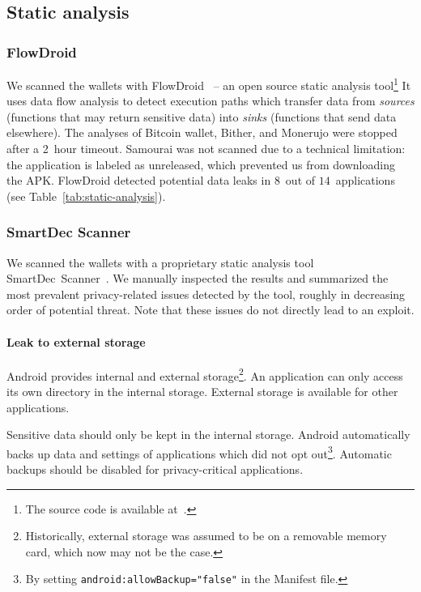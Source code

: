 \subsection{Static analysis}

\subsubsection*{FlowDroid}

We scanned the wallets with FlowDroid~\cite{Arzt2014} -- an open source static analysis tool\footnote{The source code is available at~\cite{FlowDroid}.}
It uses data flow analysis to detect execution paths which transfer data from \textit{sources} (functions that may return sensitive data) into \textit{sinks} (functions that send data elsewhere).
The analyses of Bitcoin wallet, Bither, and Monerujo were stopped after a 2~hour timeout.
Samourai was not scanned due to a technical limitation: the application is labeled as unreleased, which prevented us from downloading the APK.
FlowDroid detected potential data leaks in $8$~out of $14$~applications (see Table~\ref{tab:static-analysis}).

\subsubsection*{SmartDec Scanner}
We scanned the wallets with a proprietary static analysis tool SmartDec~Scanner~\cite{SmartDec2018}.
We manually inspected the results and summarized the most prevalent privacy-related issues detected by the tool, roughly in decreasing order of potential threat.
Note that these issues do not directly lead to an exploit.

\paragraph{Leak to external storage}
Android provides internal and external storage\footnote{Historically, external storage was assumed to be on a removable memory card, which now may not be the case.}.
An application can only access its own directory in the internal storage.
External storage is available for other applications.

Sensitive data should only be kept in the internal storage.
Android automatically backs up data and settings of applications which did not opt out\footnote{By setting \texttt{android:allowBackup="false"} in the Manifest file.}.
Automatic backups should be disabled for privacy-critical applications.

